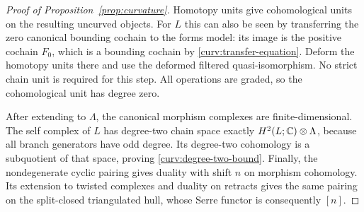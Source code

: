 \begin{proof}[Proof of Proposition~\ref{prop:curvature}]
Homotopy units give cohomological units on the resulting uncurved
objects.  For $L$ this can also be seen by transferring the zero
canonical bounding cochain to the forms model: its image is the
positive cochain $F_0$, which is a bounding cochain by
\eqref{curv:transfer-equation}.  Deform the homotopy units there and
use the deformed filtered quasi-isomorphism.  No strict chain unit
is required for this step.  All operations are graded, so the
cohomological unit has degree zero.

After extending to $\Lambda$, the canonical morphism complexes are
finite-dimensional.  The self complex of $L$ has degree-two chain
space exactly $H^2(L;\mathbb C)\otimes\Lambda$, because all branch
generators have odd degree.  Its degree-two cohomology is a
subquotient of that space, proving \eqref{curv:degree-two-bound}.
Finally, the nondegenerate cyclic pairing gives duality with shift
$n$ on morphism cohomology.  Its extension to twisted complexes and
duality on retracts gives the same pairing on the split-closed
triangulated hull, whose Serre functor is consequently $[n]$.
\end{proof}
